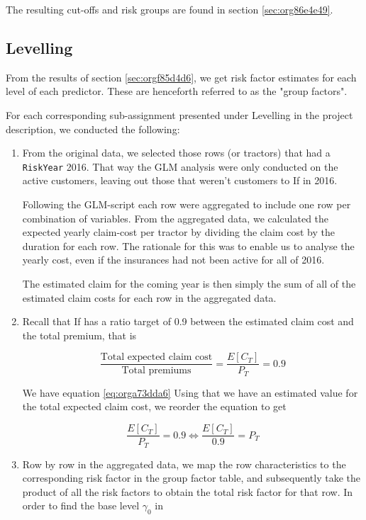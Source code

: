 \documentclass[11pt]{article}
\begin{document}
The resulting cut-offs and risk groups are found in section \ref{sec:org86e4e49}.

\subsection{Levelling}
\label{sec:org7972a66}

From the results of section \ref{sec:orgf85d4d6}, we get risk factor estimates for each
level of each predictor. These are henceforth referred to as the "group factors".

For each corresponding sub-assignment presented under Levelling in the project description, we conducted the
following:

\begin{enumerate}
\item From the original data, we selected those rows (or tractors) that had a \texttt{RiskYear} 2016. That 
way the GLM analysis were only conducted on the active customers, leaving out those that weren't 
customers to If in 2016.

Following the GLM-script each row were aggregated to include one row per combination of variables. 
From the aggregated data, we calculated the expected yearly claim-cost per tractor by dividing the
claim cost by the duration for each row. The rationale for this was to enable us to analyse the 
yearly cost, even if the insurances had not been active for all of 2016.

The estimated claim for the coming year is then simply the sum of all of the estimated claim costs 
for each row in the aggregated data.

\item Recall that If has a ratio target of 0.9 between the estimated claim cost and the total premium, that is

\begin{equation}
\label{eq:orgd21207c}
\frac{\text{Total expected claim cost}}{\text{Total premiums}} = \frac{E[C_T]}{P_T} = 0.9 
\end{equation}

We have equation \ref{eq:orga73dda6} Using that we have an estimated value for the total expected claim cost, we reorder the equation to get

\[
      \frac{E[C_T]}{P_T} = 0.9 \iff \frac{E[C_T]}{0.9} = P_T
      \]

\item Row by row in the aggregated data, we map the row characteristics to the corresponding risk factor 
in the group factor table, and subsequently take the product of all the risk factors 
to obtain the total risk factor for that row. In order to find the base level \(\gamma_0\) in
\end{enumerate}
\end{document}
